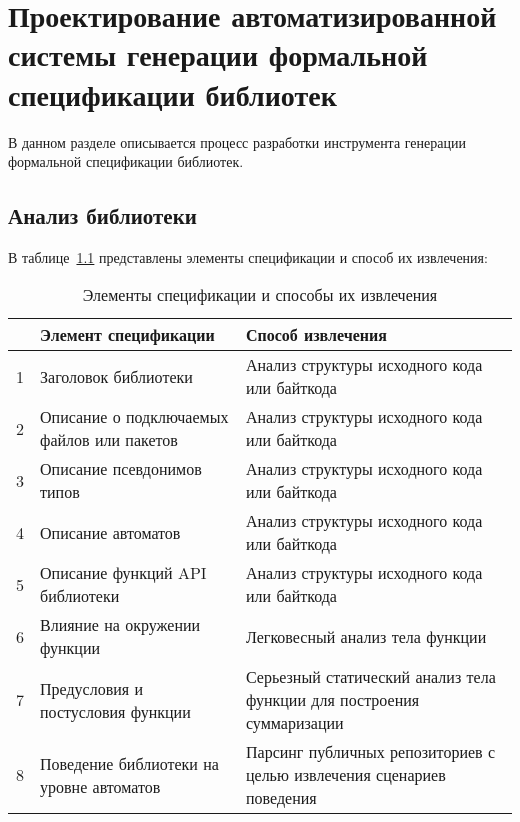 \chapter{Проектирование автоматизированной системы генерации формальной спецификации библиотек}

В данном разделе описывается процесс разработки инструмента генерации формальной спецификации библиотек.

\section{Анализ библиотеки}

В таблице~\ref{tabular:first_tab} представлены элементы спецификации и способ их извлечения:

\begin{table}[H]
	\caption{Элементы спецификации и способы их извлечения}
	\begin{center}
		\begin{tabular}{|p{0.5cm}|p{5cm}|p{5cm}|}
			\hline
			& Элемент спецификации & Способ извлечения\\ \hline

			1 & Заголовок библиотеки & Анализ структуры исходного кода или байткода\\ \hline
			2 & Описание о подключаемых файлов или пакетов & Анализ структуры исходного кода или байткода\\ \hline
			3 & Описание псевдонимов типов & Анализ структуры исходного кода или байткода\\ \hline
			4 & Описание автоматов & Анализ структуры исходного кода или байткода\\ \hline
			5 & Описание функций API библиотеки & Анализ структуры исходного кода или байткода\\ \hline
			6 & Влияние на окружении функции & Легковесный анализ тела функции\\ \hline
		    7 & Предусловия и постусловия функции & Серьезный статический анализ тела функции для построения суммаризации\\ \hline
			8 & Поведение библиотеки на уровне автоматов & Парсинг публичных репозиториев с целью извлечения сценариев поведения\\ \hline
		\end{tabular}
		\label{tabular:first_tab}
	\end{center}
\end{table}

